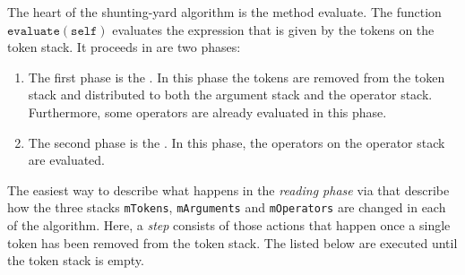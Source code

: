 The heart of the shunting-yard algorithm is the method evaluate.
The function $\texttt{evaluate}(\texttt{self})$ evaluates the expression that is given by the tokens on the
token stack.  It proceeds in are two phases:
\begin{enumerate}
\item The first phase is the . In this phase
      the tokens are removed from the token stack and distributed to both the argument stack and the operator
      stack.  Furthermore, some operators are already evaluated in this phase.
\item The second phase is the .  In this phase,
      the  operators on the operator stack are evaluated.  
\end{enumerate}
The easiest way to describe what happens in the \emph{reading phase} via
 that describe how the three stacks \texttt{mTokens}, \texttt{mArguments} and \texttt{mOperators}
are changed in each  of the algorithm.  Here, a \emph{step} consists of those actions that happen
once a single token has been removed from the token stack.
The  listed below are executed until the token stack is empty.

